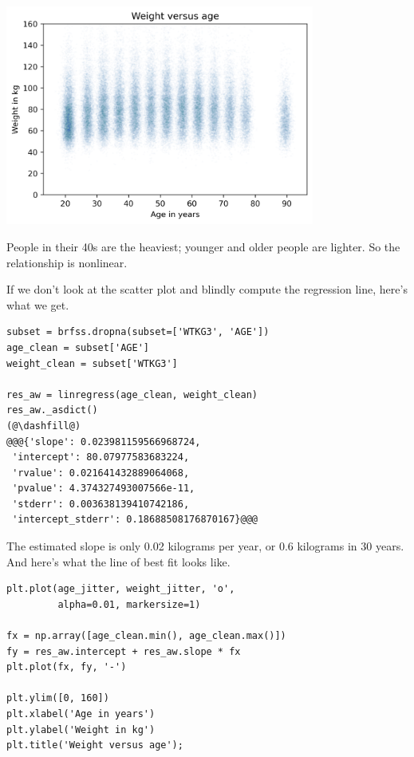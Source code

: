 \begin{center}
\includegraphics[width=4in]{chapters/09_relationships_files/09_relationships_103_0.png}
\end{center}

People in their 40s are the heaviest; younger and older people are
lighter. So the relationship is nonlinear.

If we don't look at the scatter plot and blindly compute the regression
line, here's what we get.

\begin{lstlisting}[]
subset = brfss.dropna(subset=['WTKG3', 'AGE'])
age_clean = subset['AGE']
weight_clean = subset['WTKG3']

res_aw = linregress(age_clean, weight_clean)
res_aw._asdict()
(@\dashfill@)
@@@{'slope': 0.023981159566968724,
 'intercept': 80.07977583683224,
 'rvalue': 0.021641432889064068,
 'pvalue': 4.374327493007566e-11,
 'stderr': 0.003638139410742186,
 'intercept_stderr': 0.18688508176870167}@@@
\end{lstlisting}

The estimated slope is only 0.02 kilograms per year, or 0.6 kilograms in
30 years. And here's what the line of best fit looks like.

\begin{lstlisting}[]
plt.plot(age_jitter, weight_jitter, 'o', 
         alpha=0.01, markersize=1)

fx = np.array([age_clean.min(), age_clean.max()])
fy = res_aw.intercept + res_aw.slope * fx
plt.plot(fx, fy, '-')

plt.ylim([0, 160])
plt.xlabel('Age in years')
plt.ylabel('Weight in kg')
plt.title('Weight versus age');
\end{lstlisting}

